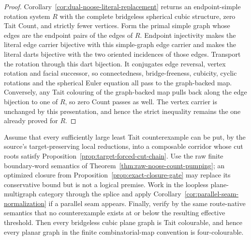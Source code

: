 \begin{proof}
Corollary~\ref{cor:dual-noose-literal-replacement} returns an endpoint-simple
rotation system \(R\) with the complete bridgeless spherical cubic structure,
zero Tait Count, and strictly fewer vertices.  Form the primal simple graph
whose edges are the endpoint pairs of the edges of \(R\).  Endpoint
injectivity makes the literal edge carrier bijective with this simple-graph
edge carrier and makes the literal darts bijective with the two oriented
incidences of those edges.  Transport the rotation through this dart
bijection.  It conjugates edge reversal, vertex rotation and facial
successor, so connectedness, bridge-freeness, cubicity, cyclic rotations and
the spherical Euler equation all pass to the graph-backed map.  Conversely,
any Tait colouring of the graph-backed map pulls back along the edge
bijection to one of \(R\), so zero Count passes as well.  The vertex carrier
is unchanged by this presentation, and hence the strict inequality remains
the one already proved for \(R\).
\end{proof}

\begin{theorem}
\label{thm:direct-count-reductive-assembly}
Assume that every sufficiently large least Tait counterexample can be put,
by the source's target-preserving local reductions, into a composable corridor
whose cut roots satisfy Proposition~\ref{prop:target-forced-cut-chain}.
Use the raw finite boundary-word semantics of
Theorem~\ref{thm:raw-noose-count-pumping}; an optimized closure from
Proposition~\ref{prop:exact-closure-gate} may replace its conservative bound
but is not a logical premise.  Work in the loopless plane-multigraph category
through the splice and apply
Corollary~\ref{cor:parallel-seam-normalization} if a parallel seam appears.
Finally,
verify by the same route-native semantics that no
counterexample exists at or below the resulting effective threshold.  Then
every bridgeless cubic plane graph is Tait colourable, and hence every planar
graph in the finite combinatorial-map convention is four-colourable.
\end{theorem}

